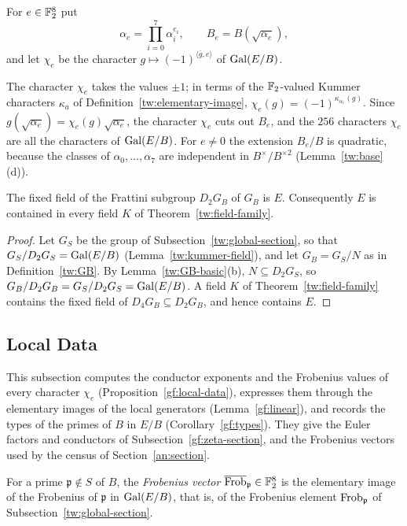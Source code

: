 \begin{definition}\label{gf:characters}
For $e\in\mathbb F_2^8$ put
\[
 \alpha_e=\prod_{i=0}^7\alpha_i^{e_i},\qquad B_e=B(\sqrt{\alpha_e}),
\]
and let $\chi_e$ be the character $g\mapsto(-1)^{\langle\bar g,e\rangle}$ of
$\operatorname{Gal}(E/B)$.
\end{definition}

The character $\chi_e$ takes the values $\pm1$; in terms of the
$\mathbb F_2$-valued Kummer characters $\kappa_a$ of
Definition~\ref{tw:elementary-image}, $\chi_e(g)=(-1)^{\kappa_{\alpha_e}(g)}$.
Since $g(\sqrt{\alpha_e})=\chi_e(g)\sqrt{\alpha_e}$,
the character $\chi_e$ cuts out $B_e$, and the $256$ characters $\chi_e$ are
all the characters of $\operatorname{Gal}(E/B)$. For $e\ne0$ the extension $B_e/B$ is
quadratic, because the classes of $\alpha_0,\ldots,\alpha_7$ are independent
in $B^\times/B^{\times2}$ (Lemma~\ref{tw:base}(d)).

\begin{lemma}\label{gf:in-tower}
The fixed field of the Frattini subgroup $D_2G_B$ of $G_B$ is $E$.
Consequently $E$ is contained in every field $K$ of
Theorem~\ref{tw:field-family}.
\end{lemma}

\begin{proof}
Let $G_S$ be the group of Subsection~\ref{tw:global-section}, so
that $G_S/D_2G_S=\operatorname{Gal}(E/B)$ (Lemma~\ref{tw:kummer-field}), and let
$G_B=G_S/N$ as in Definition~\ref{tw:GB}. By Lemma~\ref{tw:GB-basic}(b),
$N\subseteq D_2G_S$, so
$G_B/D_2G_B=G_S/D_2G_S=\operatorname{Gal}(E/B)$. A field $K$ of
Theorem~\ref{tw:field-family} contains the fixed field of
$D_4G_B\subseteq D_2G_B$, and hence contains $E$.
\end{proof}

\subsection{Local Data}\label{gf:local-section}
This subsection computes the conductor exponents and the Frobenius values of
every character $\chi_e$ (Proposition~\ref{gf:local-data}), expresses them
through the elementary images of the local generators
(Lemma~\ref{gf:linear}), and records the types of the primes of $B$ in $E/B$
(Corollary~\ref{gf:types}). They give the Euler factors and conductors of
Subsection~\ref{gf:zeta-section}, and the Frobenius vectors used by the
census of Section~\ref{an:section}.

\begin{definition}\label{gf:frobenius-vector}
For a prime $\mathfrak p\notin S$ of $B$, the \emph{Frobenius vector}
$\overline{\operatorname{Frob}}_{\mathfrak p}\in\mathbb F_2^8$ is the elementary image of the
Frobenius of $\mathfrak p$ in $\operatorname{Gal}(E/B)$, that is, of the Frobenius element
$\operatorname{Frob}_{\mathfrak p}$ of Subsection~\ref{tw:global-section}.
\end{definition}

